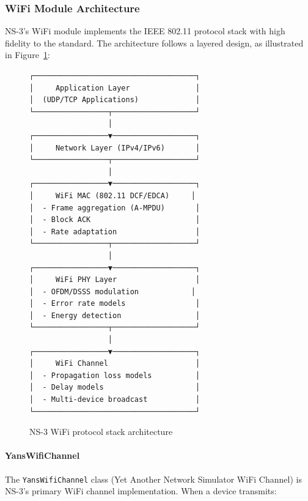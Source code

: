 \subsubsection{WiFi Module Architecture}

NS-3's WiFi module implements the IEEE 802.11 protocol stack with high fidelity to the standard. The architecture follows a layered design, as illustrated in Figure~\ref{fig:ns3-wifi-stack}:

\begin{figure}[htbp]
\centering
\begin{verbatim}
┌─────────────────────────────────────┐
│     Application Layer               │
│  (UDP/TCP Applications)             │
└─────────────────┬───────────────────┘
                  │
┌─────────────────▼───────────────────┐
│     Network Layer (IPv4/IPv6)       │
└─────────────────┬───────────────────┘
                  │
┌─────────────────▼───────────────────┐
│     WiFi MAC (802.11 DCF/EDCA)     │
│  - Frame aggregation (A-MPDU)       │
│  - Block ACK                        │
│  - Rate adaptation                  │
└─────────────────┬───────────────────┘
                  │
┌─────────────────▼───────────────────┐
│     WiFi PHY Layer                  │
│  - OFDM/DSSS modulation            │
│  - Error rate models                │
│  - Energy detection                 │
└─────────────────┬───────────────────┘
                  │
┌─────────────────▼───────────────────┐
│     WiFi Channel                    │
│  - Propagation loss models          │
│  - Delay models                     │
│  - Multi-device broadcast           │
└─────────────────────────────────────┘
\end{verbatim}
\caption{NS-3 WiFi protocol stack architecture}
\label{fig:ns3-wifi-stack}
\end{figure}

\paragraph{YansWifiChannel}
The \texttt{YansWifiChannel} class (Yet Another Network Simulator WiFi Channel) is NS-3's primary WiFi channel implementation. When a device transmits:

